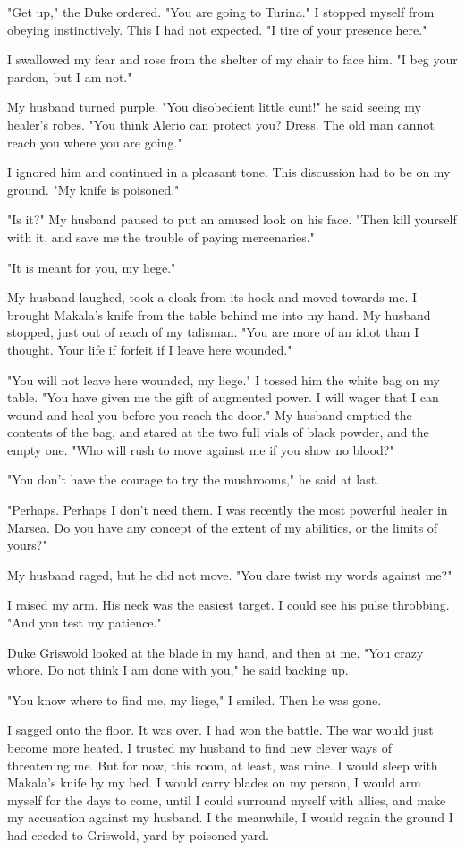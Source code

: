 \documentclass{article}
\begin{document}
"Get up," the Duke ordered. "You are going to Turina." I stopped myself from obeying instinctively. This I had not expected. "I tire of your presence here."

I swallowed my fear and rose from the shelter of my chair to face him. "I beg your pardon, but I am not."

My husband turned purple. "You disobedient little cunt!" he said seeing my healer's robes. "You think Alerio can protect you? Dress. The old man cannot reach you where you are going." 

I ignored him and continued in a pleasant tone. This discussion had to be on my ground. "My knife is poisoned."

"Is it?" My husband paused to put an amused look on his face. "Then kill yourself with it, and save me the trouble of paying mercenaries."

"It is meant for you, my liege."

My husband laughed, took a cloak from its hook and moved towards me. I brought Makala's knife from the table behind me into my hand. My husband stopped, just out of reach of my talisman. "You are more of an idiot than I thought. Your life if forfeit if I leave here wounded."

"You will not leave here wounded, my liege." I tossed him the white bag on my table. "You have given me the gift of augmented power. I will wager that I can wound and heal you before you reach the door." My husband emptied the contents of the bag, and stared at the two full vials of black powder, and the empty one. "Who will rush to move against me if you show no blood?"

"You don't have the courage to try the mushrooms," he said at last.

"Perhaps. Perhaps I don't need them. I was recently the most powerful healer in Marsea. Do you have any concept of the extent of my abilities, or the limits of yours?"

My husband raged, but he did not move. "You dare twist my words against me?"

I raised my arm. His neck was the easiest target. I could see his pulse throbbing. "And you test my patience."

Duke Griswold looked at the blade in my hand, and then at me. "You crazy whore. Do not think I am done with you," he said backing up.

"You know where to find me, my liege," I smiled. Then he was gone.

I sagged onto the floor. It was over. I had won the battle. The war would just become more heated. I trusted my husband to find new clever ways of threatening me. But for now, this room, at least, was mine. I would sleep with Makala's knife by my bed. I would carry blades on my person, I would arm myself for the days to come, until I could surround myself with allies, and make my accusation against my husband. I the meanwhile, I would regain the ground I had ceeded to Griswold, yard by poisoned yard.
\end{document}
